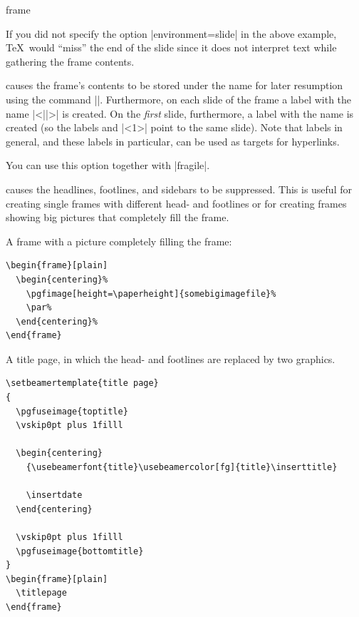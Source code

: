 \begin{environment}{{frame}}
\begin{frame}[<+->][plain]
\begin{frame}
    If you did not specify the option |environment=slide| in the above example, \TeX\ would ``miss'' the end of the slide since it does not interpret text while gathering the frame contents.
  \item
     causes the frame's contents to be stored under the name  for later resumption using the command |\againframe|. Furthermore, on each slide of the frame a label with the name |<||>| is created. On the \emph{first} slide, furthermore, a label with the name  is created (so the labels  and |<1>| point to the same slide). Note that labels in general, and these labels in particular, can be used as targets for hyperlinks.

    You can use this option together with |fragile|.
  \item
     causes the headlines, footlines, and sidebars to be suppressed. This is useful for creating single frames with different head- and footlines or for creating frames showing big pictures that completely fill the frame.

    \example
    A frame with a picture completely filling the frame:

\begin{verbatim}
\begin{frame}[plain]
  \begin{centering}%
    \pgfimage[height=\paperheight]{somebigimagefile}%
    \par%
  \end{centering}%
\end{frame}
\end{verbatim}

    \example
    A title page, in which the head- and footlines are replaced by two graphics.

\begin{verbatim}
\setbeamertemplate{title page}
{
  \pgfuseimage{toptitle}
  \vskip0pt plus 1filll

  \begin{centering}
    {\usebeamerfont{title}\usebeamercolor[fg]{title}\inserttitle}

    \insertdate
  \end{centering}

  \vskip0pt plus 1filll
  \pgfuseimage{bottomtitle}
}
\begin{frame}[plain]
  \titlepage
\end{frame}
\end{verbatim}


\end{frame}
\end{frame}
\end{environment}
